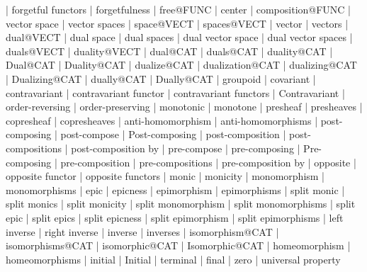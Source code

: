     |   forgetful functors
    |   forgetfulness
    |   free@FUNC
    |   center
    |   composition@FUNC
    |   vector space
    |   vector spaces
    |   space@VECT
    |   spaces@VECT
    |   vector
    |   vectors
    |   dual@VECT
    |   dual space
    |   dual spaces
    |   dual vector space
    |   dual vector spaces
    |   duals@VECT
    |   duality@VECT
    |   dual@CAT
    |   duals@CAT
    |   duality@CAT
    |   Dual@CAT
    |   Duality@CAT
    |   dualize@CAT
    |   dualization@CAT
    |   dualizing@CAT
    |   Dualizing@CAT
    |   dually@CAT
    |   Dually@CAT
    |   groupoid
    |   covariant
    |   contravariant
    |   contravariant functor
    |   contravariant functors
    |   Contravariant
    |   order-reversing
    |   order-preserving
    |   monotonic
    |   monotone
    |   presheaf
    |   presheaves
    |   copresheaf
    |   copresheaves
    |   anti-homomorphism
    |   anti-homomorphisms
    |   post-composing
    |   post-compose
    |   Post-composing
    |   post-composition
    |   post-compositions
    |   post-composition by
    |   pre-compose
    |   pre-composing
    |   Pre-composing
    |   pre-composition
    |   pre-compositions
    |   pre-composition by
    |   opposite
    |   opposite functor
    |   opposite functors
    |   monic
    |   monicity
    |   monomorphism
    |   monomorphisms
    |   epic
    |   epicness
    |   epimorphism
    |   epimorphisms
    |   split monic
    |   split monics
    |   split monicity
    |   split monomorphism
    |   split monomorphisms
    |   split epic
    |   split epics
    |   split epicness
    |   split epimorphism
    |   split epimorphisms
    |   left inverse
    |   right inverse
    |   inverse
    |   inverses
    |   isomorphism@CAT
    |   isomorphisms@CAT
    |   isomorphic@CAT
    |   Isomorphic@CAT
    |   homeomorphism
    |   homeomorphisms
    |   initial
    |   Initial
    |   terminal
    |   final
    |   zero
    |   universal property
